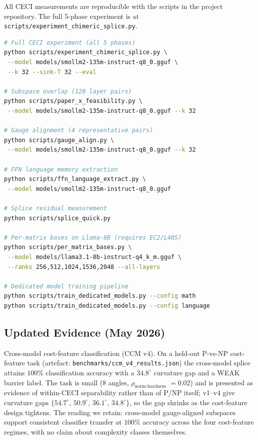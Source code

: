 \documentclass[11pt]{article}
\begin{document}
\label{sec:repro}

All CECI measurements are reproducible with the scripts in the
project repository. The full 5-phase experiment is at
\texttt{scripts/experiment\_chimeric\_splice.py}.

\begin{lstlisting}[language=bash]
# Full CECI experiment (all 5 phases)
python scripts/experiment_chimeric_splice.py \
 --model models/smollm2-135m-instruct-q8_0.gguf \
 --k 32 --sink-T 32 --eval

# Subspace overlap (120 layer pairs)
python scripts/paper_x_feasibility.py \
 --model models/smollm2-135m-instruct-q8_0.gguf --k 32

# Gauge alignment (4 representative pairs)
python scripts/gauge_align.py \
 --model models/smollm2-135m-instruct-q8_0.gguf --k 32

# FFN language memory extraction
python scripts/ffn_language_extract.py \
 --model models/smollm2-135m-instruct-q8_0.gguf

# Splice residual measurement
python scripts/splice_quick.py

# Per-matrix bases on Llama-8B (requires EC2/L40S)
python scripts/per_matrix_bases.py \
 --model models/llama3.1-8b-instruct-q4_k_m.gguf \
 --ranks 256,512,1024,1536,2048 --all-layers

# Dedicated model training pipeline
python scripts/train_dedicated_models.py --config math
python scripts/train_dedicated_models.py --config language
\end{lstlisting}

\clearpage
\printbibliography

\subsection{Updated Evidence (May 2026)}
Cross-model cost-feature classification (CCM v4).
On a held-out P-vs-NP cost-feature task (artefact:
\texttt{benchmarks/ccm\_v4\_results.json}) the cross-model splice attains
$100\%$ classification accuracy with a $34.8^\circ$ curvature gap and a
WEAK barrier label.  The task is small (8 angles, $\rho_{\text{norm-hardness}}$
$=0.02$) and is presented as evidence of within-CECI separability rather
than of P/NP itself; v1--v4 give curvature gaps $\{54.7^\circ,\,50.9^\circ,\,
36.1^\circ,\,34.8^\circ\}$, so the gap shrinks as the cost-feature
design tightens.  The reading we retain: cross-model gauge-aligned
subspaces support consistent classifier transfer at $100\%$ accuracy
across the four cost-feature regimes, with no claim about complexity
classes themselves.
\end{document}
